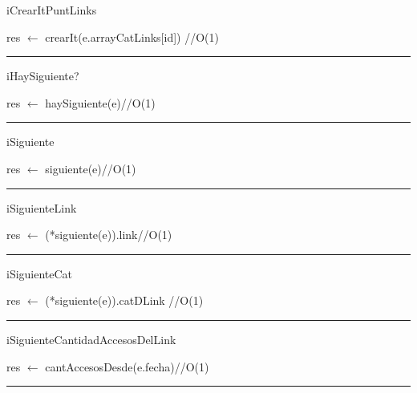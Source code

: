 \begin{algorithm}[H]
\caption{iCrearItPuntLinks}
\begin{algorithmic}[1]
\State res $\gets$ crearIt(e.arrayCatLinks[id]) \hfill //O(1)
\EndFunction 
\end{algorithmic}
\hrule
{}
\end{algorithm}

\begin{algorithm}[H]
\caption{iHaySiguiente?}
\begin{algorithmic}[1]
\state res $\gets$ haySiguiente(e)\hfill //O(1)
\EndFunction 
\end{algorithmic}
\hrule
{}
\end{algorithm}

\begin{algorithm}[H]
\caption{iSiguiente}
\begin{algorithmic}[1]
\state res $\gets$ siguiente(e)\hfill //O(1)
\EndFunction 
\end{algorithmic}
\hrule
{}
\end{algorithm}

\begin{algorithm}[H]
\caption{iSiguienteLink}
\begin{algorithmic}[1]
\state res $\gets$ (*siguiente(e)).link\hfill //O(1)
\EndFunction 
\end{algorithmic}
\hrule
{}
\end{algorithm}


\begin{algorithm}[H]
\caption{iSiguienteCat}
\begin{algorithmic}[1]
\state res $\gets$ (*siguiente(e)).catDLink \hfill //O(1)
\EndFunction 
\end{algorithmic}
\hrule
{}
\end{algorithm}

\begin{algorithm}[H]
\caption{iSiguienteCantidadAccesosDelLink}
\begin{algorithmic}[1]
\state res $\gets$ cantAccesosDesde(e.fecha)\hfill //O(1)
\EndFunction 
\end{algorithmic}
\hrule
{}
\end{algorithm}

